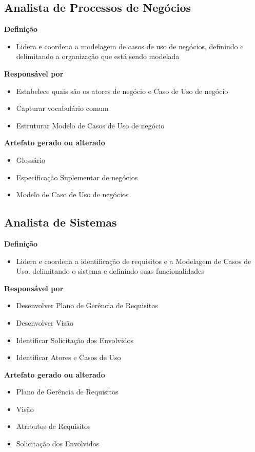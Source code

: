 \subsection{Analista de Processos de Negócios}

\textbf{Definição}
\begin{itemize}
\item Lidera e coordena a modelagem de casos de uso de negócios, definindo e delimitando a organização que está sendo modelada
\end{itemize}

\textbf{Responsável por}
\begin{itemize}
\item Estabelece quais são os atores de negócio e Caso de Uso de negócio
\item Capturar vocabulário comum
\item Estruturar Modelo de Casos de Uso de negócio
\end{itemize}

\textbf{Artefato gerado ou alterado}
\begin{itemize}
\item Glossário
\item Especificação Suplementar de negócios
\item Modelo de Caso de Uso de negócios
\end{itemize}

\subsection{Analista de Sistemas}

\textbf{Definição}
\begin{itemize}
\item Lidera e coordena a identificação de requisitos e a Modelagem de Casos de Uso, delimitando o sistema e definindo suas funcionalidades
\end{itemize}

\textbf{Responsável por}
\begin{itemize}
\item Desenvolver Plano de Gerência de Requisitos
\item Desenvolver Visão
\item Identificar Solicitação dos Envolvidos
\item Identificar Atores e Casos de Uso
\end{itemize}

\textbf{Artefato gerado ou alterado}
\begin{itemize}
\item Plano de Gerência de Requisitos
\item Visão
\item Atributos de Requisitos
\item Solicitação dos Envolvidos
\end{itemize}


